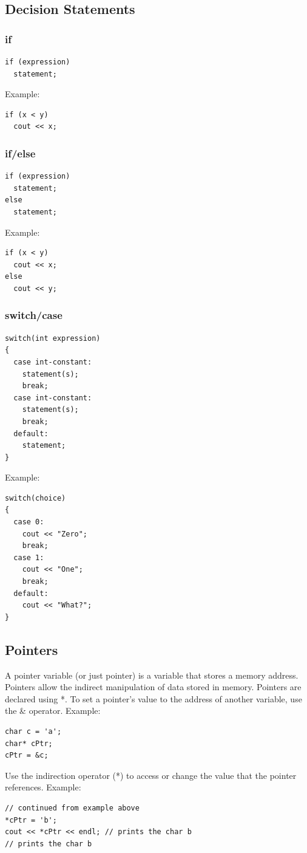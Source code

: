 \documentclass{article}
\begin{document}
\subsection*{Decision Statements}

\subsubsection*{if}
\begin{verbatim}
if (expression)
  statement;
\end{verbatim}
Example:
\begin{verbatim}
if (x < y)
  cout << x;
\end{verbatim}

\subsubsection*{if/else}
\begin{verbatim}
if (expression)
  statement;
else
  statement;
\end{verbatim}
Example:
\begin{verbatim}
if (x < y)
  cout << x;
else
  cout << y;
\end{verbatim}

\subsubsection*{switch/case}
\begin{verbatim}
switch(int expression)
{
  case int-constant:
    statement(s);
    break;
  case int-constant:
    statement(s);
    break;
  default:
    statement;
}
\end{verbatim}
Example:
\begin{verbatim}
switch(choice)
{
  case 0:
    cout << "Zero";
    break;
  case 1:
    cout << "One";
    break;
  default:
    cout << "What?";
}
\end{verbatim}

\subsection*{Pointers}
A pointer variable (or just pointer) is a variable that stores a memory address. Pointers allow the indirect manipulation of data stored in memory. Pointers are declared using *. To set a pointer's value to the address of another variable, use the \& operator.
Example:
\begin{verbatim}
char c = 'a';
char* cPtr;
cPtr = &c;
\end{verbatim}
Use the indirection operator (*) to access or change the value that the pointer references.
Example:
\begin{verbatim}
// continued from example above
*cPtr = 'b';
cout << *cPtr << endl; // prints the char b
// prints the char b
\end{verbatim}
\end{document}
